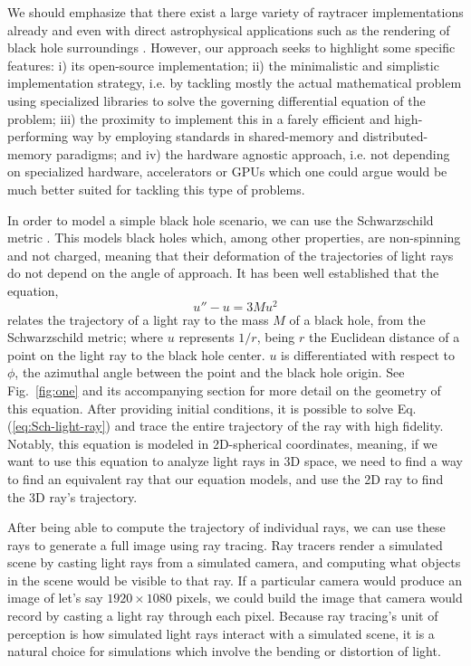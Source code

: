 We should emphasize that there exist a large variety of raytracer implementations already 
\cite{imbens2023graphicalprocessinggeodesicpropagation,10.2312/EGPGV/EGPGV12/051-060,7539599_OSPRay}
and even with direct astrophysical applications such as the rendering of black hole surroundings
\cite{10.2312:vmv.20221208,sharma2023mahakalapythonbasedmodularraytracing,James_2015}.
However, our approach seeks to highlight some specific features:
i) its open-source implementation;
ii) the minimalistic and simplistic implementation strategy, i.e. by tackling
mostly the actual mathematical problem using specialized libraries
to solve the governing differential equation of the problem;
iii) the proximity  to implement this in a farely efficient and high-performing
way by employing standards in shared-memory and distributed-memory paradigms;
and iv) the hardware agnostic approach, i.e. not depending on specialized hardware, accelerators or GPUs which one could argue would be much better suited for tackling this type of problems.

In order to model a simple black hole scenario, we can use the Schwarzschild metric \cite{schw_soln-2007}.
This models black holes which, among other properties, are non-spinning and not charged,
meaning that their deformation of the trajectories of light rays do not depend on the angle of approach.
It has been well established \cite{gravitation-mtw} that the equation,
\begin{equation}
	u'' - u = 3 M u^2
	\label{eq:Sch-light-ray}
\end{equation}
relates the trajectory of a light ray to the mass $M$ of a black hole, from the Schwarzschild metric;
where $u$ represents $1/r$, being $r$ the Euclidean distance of a point on the light ray to the black hole center.
$u$ is differentiated with respect to $\phi$, the azimuthal angle between the point and the black hole origin. See Fig.~\ref{fig:one} and its accompanying section for more detail on the geometry of this equation.
After providing initial conditions,  it is possible to solve Eq.(\ref{eq:Sch-light-ray}) and trace the entire trajectory of the ray with high fidelity.
Notably, this equation is modeled in 2D-spherical coordinates, meaning, if we want to use this equation to analyze light rays in 3D space, we need to find a way to find an equivalent ray that our equation models, and use the 2D ray to find the 3D ray's trajectory.

After being able to compute the trajectory of individual rays, we can use these rays to generate a full image using ray tracing. Ray tracers render a simulated scene by casting light rays from a simulated camera, and computing what objects in the scene would be visible to that ray. If a particular camera would produce an image of let's say $1920 \times 1080$ pixels, we could build the image that camera would record by casting a light ray through each pixel. Because ray tracing's unit of perception is how simulated light rays interact with a simulated scene, it is a natural choice for simulations which involve the bending or distortion of light.

